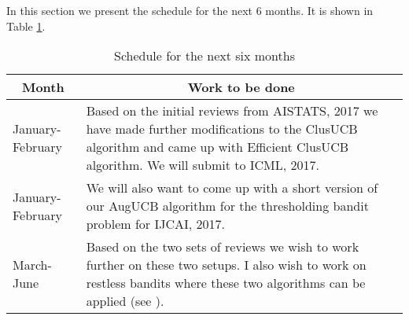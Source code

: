 In this section we present the schedule for the next 6 months. It is shown in Table \ref{tab:schedule}.

\begin{table}
\caption{Schedule for the next six months}
\label{tab:schedule}
\begin{center}
\begin{tabular}{p{2cm}p{12cm}}
\multicolumn{1}{c}{\bf Month} &\multicolumn{1}{c}{\bf Work to be done } 
\\\midrule
January-February        &Based on the initial reviews from AISTATS, 2017 we have made further modifications to the ClusUCB algorithm and came up with Efficient ClusUCB algorithm. We will submit to ICML, 2017. \\\midrule
January-February	&We will also want to come up with a short version of our AugUCB algorithm for the thresholding bandit problem for IJCAI, 2017.\\\midrule
March-June	&Based on the two sets of reviews we wish to work further on these two setups. I also wish to work on restless bandits where these two algorithms can be applied (see \cite{garivier2011upper}).\\\midrule 
\end{tabular}
\end{center}
\end{table}